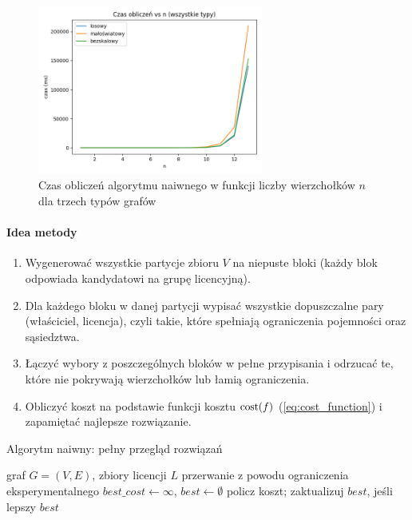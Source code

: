 \begin{figure}[H]
  \centering
  \includegraphics[width=0.66\textwidth]{assets/all_types_plot.png}
  \caption{Czas obliczeń algorytmu naiwnego w funkcji liczby wierzchołków $n$ dla trzech typów grafów}
  \label{fig:all_types_time}
\end{figure}

\paragraph{Idea metody}
\begin{enumerate}
  \item Wygenerować wszystkie partycje zbioru \(V\) na niepuste bloki (każdy blok odpowiada kandydatowi na grupę licencyjną).
  \item Dla każdego bloku w danej partycji wypisać wszystkie dopuszczalne pary (właściciel, licencja), czyli takie, które spełniają ograniczenia pojemności oraz sąsiedztwa.
  \item Łączyć wybory z poszczególnych bloków w pełne przypisania i odrzucać te, które nie pokrywają wierzchołków lub łamią ograniczenia.
  \item Obliczyć koszt na podstawie funkcji kosztu $\operatorname{cost}(f)$ (\ref{eq:cost_function}) i zapamiętać najlepsze rozwiązanie.
\end{enumerate}

\begin{algorithm}[H]
  \caption{Algorytm naiwny: pełny przegląd rozwiązań}
  \label{alg:naive}
  \begin{algorithmic}[1]
    \Require graf \(G=(V,E)\), zbiory licencji \( L\)
     \State \Return przerwanie z powodu ograniczenia eksperymentalnego \EndIf
    \State \(best\_cost \gets \infty\), \(best \gets \emptyset\)
    \State policz koszt; zaktualizuj \(best\), jeśli lepszy
    \EndIf
    \EndFor
    \EndFor
    \State \Return \(best\)
  \end{algorithmic}
\end{algorithm}

